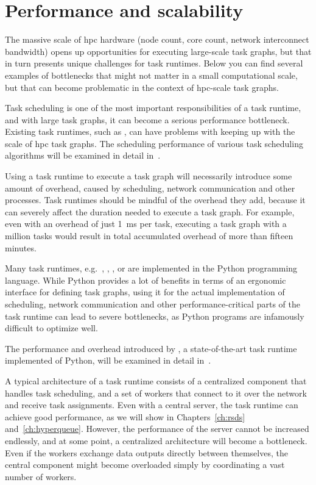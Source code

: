 \section{Performance and scalability}
The massive scale of \gls{hpc} hardware (node count, core count, network interconnect
bandwidth) opens up opportunities for executing large-scale task graphs, but that in turn presents
unique challenges for task runtimes. Below you can find several examples of bottlenecks that might
not matter in a small computational scale, but that can become problematic in the context of
\gls{hpc}-scale task graphs.

\begin{description}[wide=0pt]
	\item[Scheduling] Task scheduling is one of the most important responsibilities of a task runtime, and with large
		task graphs, it can become a serious performance bottleneck. Existing task runtimes, such as
		\dask{}, can have problems with keeping up with the scale of \gls{hpc}
		task graphs. The scheduling performance of various task scheduling algorithms will be examined in
		detail in~.
	\item[Runtime overhead] Using a task runtime to execute a task graph will necessarily introduce some amount of overhead,
		caused by scheduling, network communication and other processes. Task runtimes should be mindful of
		the overhead they add, because it can severely affect the duration needed to execute a task graph.
		For example, even with an overhead of just \SI{1}{\milli\second} per task, executing a task graph
		with a million tasks would result in total accumulated overhead of more than fifteen minutes.

		Many task runtimes, e.g.\ \dask{}, \parsl{}, \balsam{},
		\autosubmit{} or \snakemake{} are implemented in the Python programming
		language. While Python provides a lot of benefits in terms of an ergonomic interface for defining
		task graphs, using it for the actual implementation of scheduling, network communication and other
		performance-critical parts of the task runtime can lead to severe bottlenecks, as Python programs
		are infamously difficult to optimize well.

		The performance and overhead introduced by \dask{}, a state-of-the-art task runtime
		implemented of Python, will be examined in detail in~.

	\item[Architecture] A typical architecture of a task runtime consists of a centralized component that handles task
		scheduling, and a set of workers that connect to it over the network and receive task assignments.
		Even with a central server, the task runtime can achieve good performance, as we will show in
		Chapters~\ref{ch:rsds} and~\ref{ch:hyperqueue}. However, the performance of the server
		cannot be increased endlessly, and at some point, a centralized architecture will become a
		bottleneck. Even if the workers exchange data outputs directly between themselves, the central
		component might become overloaded simply by coordinating a vast number of workers.


\end{description}
